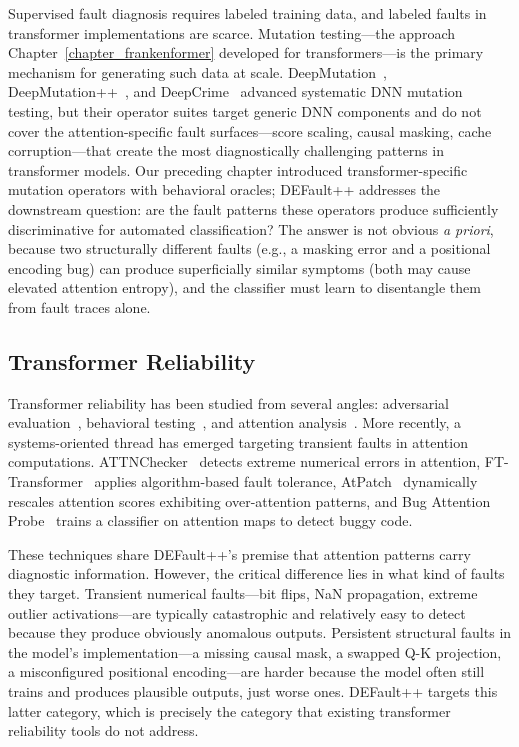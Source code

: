 Supervised fault diagnosis requires labeled training data, and labeled faults in transformer implementations are scarce. Mutation testing---the approach Chapter~\ref{chapter_frankenformer} developed for transformers---is the primary mechanism for generating such data at scale. DeepMutation~\cite{deepmutation}, DeepMutation++~\cite{deepmutationpp}, and DeepCrime~\cite{deepcrime} advanced systematic DNN mutation testing, but their operator suites target generic DNN components and do not cover the attention-specific fault surfaces---score scaling, causal masking, cache corruption---that create the most diagnostically challenging patterns in transformer models. Our preceding chapter introduced transformer-specific mutation operators with behavioral oracles; DEFault++ addresses the downstream question: are the fault patterns these operators produce sufficiently discriminative for automated classification? The answer is not obvious \emph{a priori}, because two structurally different faults (e.g., a masking error and a positional encoding bug) can produce superficially similar symptoms (both may cause elevated attention entropy), and the classifier must learn to disentangle them from fault traces alone.

\subsection{Transformer Reliability}
\label{subsec:rw_transformer_reliability}

Transformer reliability has been studied from several angles: adversarial evaluation~\cite{jones2020adversarial}, behavioral testing~\cite{ribeiro2020checklist}, and attention analysis~\cite{clark2019does, voita2019analyzing}. More recently, a systems-oriented thread has emerged targeting transient faults in attention computations. ATTNChecker~\cite{liang2025attnchecker} detects extreme numerical errors in attention, FT-Transformer~\cite{fttransformer} applies algorithm-based fault tolerance, AtPatch~\cite{atpatch2026} dynamically rescales attention scores exhibiting over-attention patterns, and Bug Attention Probe~\cite{bap2025} trains a classifier on attention maps to detect buggy code.

These techniques share DEFault++'s premise that attention patterns carry diagnostic information. However, the critical difference lies in what kind of faults they target. Transient numerical faults---bit flips, NaN propagation, extreme outlier activations---are typically catastrophic and relatively easy to detect because they produce obviously anomalous outputs. Persistent structural faults in the model's implementation---a missing causal mask, a swapped Q-K projection, a misconfigured positional encoding---are harder because the model often still trains and produces plausible outputs, just worse ones. DEFault++ targets this latter category, which is precisely the category that existing transformer reliability tools do not address.

